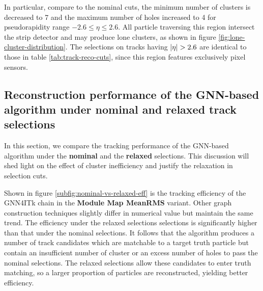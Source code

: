 In particular, compare to the nominal cuts, the minimum number of clusters is decreased to 7 and the maximum number of holes increased to 4 for pseudorapidity range $-2.6\le \eta \le 2.6$. 
All particle traversing this region intersect the strip detector and may produce lone clusters, as shown in figure \ref{fig:lone-cluster-distribution}.
The selections on tracks having $\abs{\eta} > 2.6$ are identical to those in table \ref{tab:track-reco-cuts}, since this region features exclusively pixel sensors. 

\subsection{Reconstruction performance of the GNN-based algorithm under nominal and relaxed track selections}

In this section, we compare the tracking performance of the GNN-based algorithm under the \textbf{nominal} and the \textbf{relaxed} selections.
This discussion will shed light on the effect of cluster inefficiency and justify the relaxation in selection cuts.

Shown in figure \ref{subfig:nominal-vs-relaxed-eff} is the tracking efficiency of the GNN4ITk chain in the \textbf{Module Map MeanRMS} variant. 
Other graph construction techniques slightly differ in numerical value but maintain the same trend. 
The efficiency under the relaxed selections selections is significantly higher than that under the nominal selections.
It follows that the algorithm produces a number of track candidates which are matchable to a target truth particle but contain an insufficient number of cluster or an excess number of holes to pass the nominal selections. 
The relaxed selections allow these candidates to enter truth matching, so a larger proportion of particles are reconstructed, yielding better efficiency.

